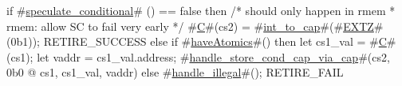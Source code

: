 if #\hyperref[sailRISCVzspeculatezyconditional]{speculate\_conditional}# () == false then {
  /* should only happen in rmem
   * rmem: allow SC to fail very early
   */
  #\hyperref[sailRISCVzC]{C}#(cs2) = #\hyperref[sailRISCVzintzytozycap]{int\_to\_cap}#(#\hyperref[sailRISCVzEXTZ]{EXTZ}#(0b1));
  RETIRE_SUCCESS
} else if #\hyperref[sailRISCVzhaveAtomics]{haveAtomics}#() then {
  let cs1_val = #\hyperref[sailRISCVzC]{C}#(cs1);
  let vaddr = cs1_val.address;
  #\hyperref[sailRISCVzhandlezystorezycondzycapzyviazycap]{handle\_store\_cond\_cap\_via\_cap}#(cs2, 0b0 @ cs1, cs1_val, vaddr)
} else {
  #\hyperref[sailRISCVzhandlezyillegal]{handle\_illegal}#();
  RETIRE_FAIL
}
